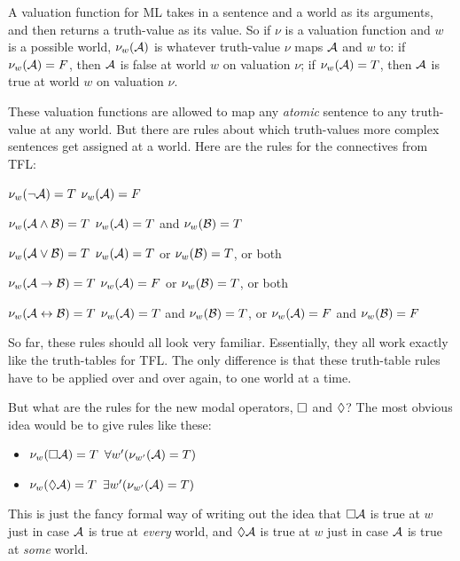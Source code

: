 A valuation function for ML takes in a sentence and a world as its arguments, and then returns a truth-value as its value. So if $\nu$ is a valuation function and $w$ is a possible world, $\nu_w(\mathcal{A})$ is whatever truth-value $\nu$ maps $\mathcal{A}$ and $w$ to: if $\nu_w(\mathcal{A})=F$, then $\mathcal{A}$ is false at world $w$ on valuation $\nu$; if $\nu_w(\mathcal{A})=T$, then $\mathcal{A}$ is true at world $w$ on valuation $\nu$.

These valuation functions are allowed to map any \emph{atomic} sentence to any truth-value at any world. But there are rules about which truth-values more complex sentences get assigned at a world. Here are the rules for the connectives from TFL:
\begin{compactlist}
	\item $\nu_w(\neg\mathcal{A})=T$ \ifeff{} $\nu_w(\mathcal{A})=F$
	\item $\nu_w(\mathcal{A}\wedge\mathcal{B})=T$ \ifeff{} $\nu_w(\mathcal{A})=T$ and $\nu_w(\mathcal{B})=T$
	\item $\nu_w(\mathcal{A}\vee\mathcal{B})=T$ \ifeff{} $\nu_w(\mathcal{A})=T$ or $\nu_w(\mathcal{B})=T$, or both
	\item $\nu_w(\mathcal{A}\rightarrow\mathcal{B})=T$ \ifeff{} $\nu_w(\mathcal{A})=F$ or $\nu_w(\mathcal{B})=T$, or both
	\item $\nu_w(\mathcal{A}\leftrightarrow\mathcal{B})=T$ \ifeff{} $\nu_w(\mathcal{A})=T$ and $\nu_w(\mathcal{B})=T$, or $\nu_w(\mathcal{A})=F$ and $\nu_w(\mathcal{B})=F$
\end{compactlist}
So far, these rules should all look very familiar. Essentially, they all work exactly like the truth-tables for TFL. The only difference is that these truth-table rules have to be applied over and over again, to one world at a time.

But what are the rules for the new modal operators, $\Box$ and $\Diamond$? The most obvious idea would be to give rules like these:
\begin{itemize}
	\item $\nu_w(\Box \mathcal{A})=T$ \ifeff{} $\forall w' (\nu_{w'}(\mathcal{A})=T)$
	\item $\nu_w(\Diamond \mathcal{A})=T$ \ifeff{} $\exists w' (\nu_{w'}(\mathcal{A})=T)$
\end{itemize}
This is just the fancy formal way of writing out the idea that $\Box\mathcal{A}$ is true at $w$ just in case $\mathcal{A}$ is true at \emph{every} world, and $\Diamond\mathcal{A}$ is true at $w$ just in case $\mathcal{A}$ is true at \emph{some} world.

